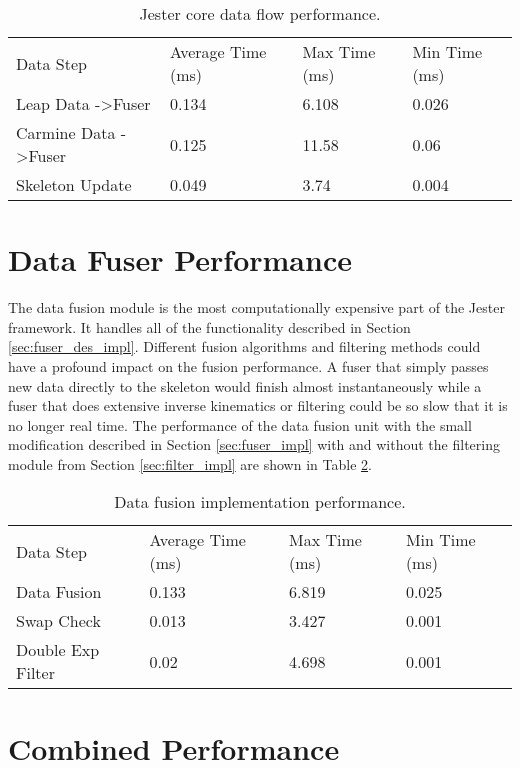\begin{table}[h]
\begin{tabular}{llll}
Data Step                        & Average Time (ms) & Max Time (ms) & Min Time (ms) \\
Leap Data -\textgreater Fuser    & 0.134             & 6.108         & 0.026             \\
Carmine Data -\textgreater Fuser & 0.125             & 11.58         & 0.06              \\
Skeleton Update                  & 0.049             & 3.74          & 0.004
\end{tabular}
\caption{Jester core data flow performance.}
\label{tab:core}
\end{table}

\section{Data Fuser Performance}

The data fusion module is the most computationally expensive part of the Jester framework. It handles all of the functionality described in Section \ref{sec:fuser_des_impl}. Different fusion algorithms and filtering methods could have a profound impact on the fusion performance. A fuser that simply passes new data directly to the skeleton would finish almost instantaneously while a fuser that does extensive inverse kinematics or filtering could be so slow that it is no longer real time. The performance of the data fusion unit with the small modification described in Section \ref{sec:fuser_impl} with and without the filtering module from Section \ref{sec:filter_impl} are shown in Table \ref{tab:fuser}.

\begin{table}[h]
\begin{tabular}{llll}
Data Step         & Average Time (ms) & Max Time (ms) & Min Time (ms) \\
Data Fusion       & 0.133             & 6.819         & 0.025         \\
Swap Check        & 0.013             & 3.427         & 0.001         \\
Double Exp Filter & 0.02              & 4.698         & 0.001        
\end{tabular}
\caption{Data fusion implementation performance.}
\label{tab:fuser}
\end{table}

\section{Combined Performance}


